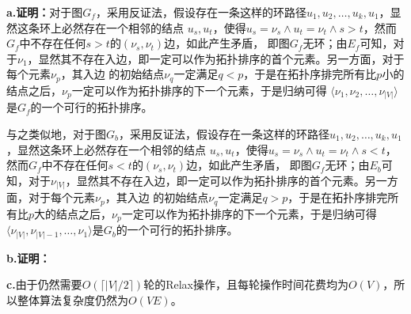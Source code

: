 \begin{solution}
    \textbf{a.证明：}对于图$G_f$，采用反证法，假设存在一条这样的环路径$u_1,u_2,\ldots,u_k,u_1$，显然这条环上必然存在一个相邻的结点
    $u_{s},u_{t}$，使得$u_{s}=\nu_s \wedge u_{t}=\nu_t\wedge s>t$，然而$G_f$中不存在任何$s>t$的$(\nu_{s},\nu_{t})$边，如此产生矛盾，
    即图$G_f$无环；由$E_f$可知，对于$\nu_1$，显然其不存在入边，即一定可以作为拓扑排序的首个元素。另一方面，对于每个元素$\nu_{p}$，其入边
    的初始结点$\nu_{q}$一定满足$q<p$，于是在拓扑序排完所有比$p$小的结点之后，$\nu_{p}$一定可以作为拓扑排序的下一个元素，于是归纳可得
    $\langle\nu_1,\nu_2,\ldots,\nu_{|V|}\rangle$ 是$G_f$的一个可行的拓扑排序。

    与之类似地，对于图$G_b$，采用反证法，假设存在一条这样的环路径$u_1,u_2,\ldots,u_k,u_1$，显然这条环上必然存在一个相邻的结点
    $u_{s},u_{t}$，使得$u_{s}=\nu_s \wedge u_{t}=\nu_t\wedge s<t$，然而$G_f$中不存在任何$s<t$的$(\nu_{s},\nu_{t})$边，如此产生矛盾，
    即图$G_f$无环；由$E_b$可知，对于$\nu_{|V|}$，显然其不存在入边，即一定可以作为拓扑排序的首个元素。另一方面，对于每个元素$\nu_{p}$，其入边
    的初始结点$\nu_{q}$一定满足$q>p$，于是在拓扑序排完所有比$p$大的结点之后，$\nu_{p}$一定可以作为拓扑排序的下一个元素，于是归纳可得
    $\langle\nu_{|V|},\nu_{|V|-1},\ldots,\nu_{1}\rangle$是$G_b$的一个可行的拓扑排序。

    \textbf{b.证明：}

    \textbf{c.}由于仍然需要$O(\lceil|V|/2\rceil)$轮的Relax操作，且每轮操作时间花费均为$O(V)$，所以整体算法复杂度仍然为$O(VE)$。
\end{solution} 